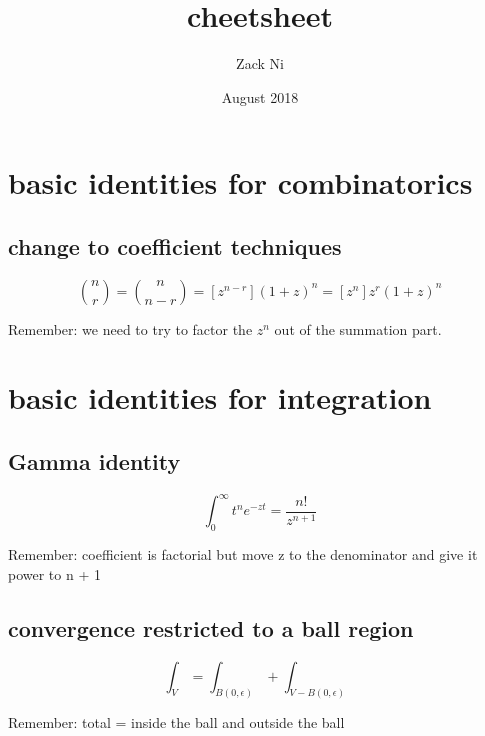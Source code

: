 \documentclass{article}
\title{cheetsheet}
\author{Zack Ni }
\date{August 2018}
\begin{document}
\maketitle

\section{basic identities for combinatorics}

\subsection{change to coefficient techniques}

$${{n}\choose{r}} = {{n}\choose{n-r}} = [z^{n-r}] (1+z)^n = [z^n] z^r(1+z)^n$$

Remember: we need to try to factor the $z^n$ out of the summation part. 

\section{basic identities for integration}

\subsection{Gamma identity}

$$\int_{0}^{\infty} t^n e^{-zt} = \frac{n!}{z^{n+1}} $$

Remember: coefficient is factorial but move z to the denominator and give it power to n + 1

\subsection{convergence restricted to a ball region}

$$\int_{V} = \int_{B(0,\epsilon)} + \int_{V-B(0,\epsilon)} $$

Remember: total = inside the ball and outside the ball
\end{document}
